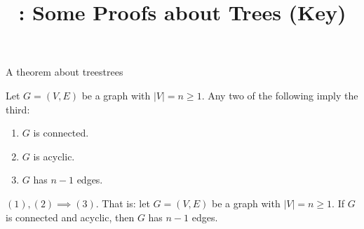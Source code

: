 \documentclass{tufte-handout}
\title{\thecourse: Some Proofs about Trees (Key)}
\date{}
\begin{document}
\maketitle

\begin{model*}{A theorem about trees}{trees}
\begin{thm}[Trees]
  Let $G = (V,E)$ be a graph with $|V| = n \geq 1$.  Any two of the following
  imply the third:
  \begin{enumerate}
  \item $G$ is connected.
  \item $G$ is acyclic.
  \item $G$ has $n-1$ edges.
  \end{enumerate}
\end{thm}
\end{model*}

\begin{lem} \label{lem:onetwothree} $(1), (2) \implies (3)$.  That is:
  let $G = (V,E)$ be a graph with $|V| = n \geq 1$.  If $G$ is
  connected and acyclic, then $G$ has $n-1$ edges.
\end{lem}
\end{document}
